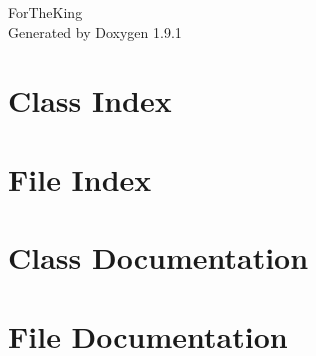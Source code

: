 \let\mypdfximage\pdfximage\def\pdfximage{\immediate\mypdfximage}\documentclass[twoside]{book}
\newcommand{\+}{\discretionary{\mbox{\scriptsize$\hookleftarrow$}}{}{}}
\newcommand{\clearemptydoublepage}{%
  \newpage{\pagestyle{empty}\cleardoublepage}%
}
\begin{document}
\raggedbottom

\hypersetup{pageanchor=false,
             bookmarksnumbered=true,
             pdfencoding=unicode
            }
\begin{titlepage}
\vspace*{7cm}
\begin{center}%
{\Large For\+The\+King }\\
\vspace*{1cm}
{\large Generated by Doxygen 1.9.1}\\
\end{center}
\end{titlepage}
\clearemptydoublepage
{}
\tableofcontents
\clearemptydoublepage
{}
\hypersetup{pageanchor=true}

\chapter{Class Index}

\chapter{File Index}

\chapter{Class Documentation}









\chapter{File Documentation}









































\backmatter
\newpage
{}
\clearemptydoublepage
{}
\printindex
\end{document}
